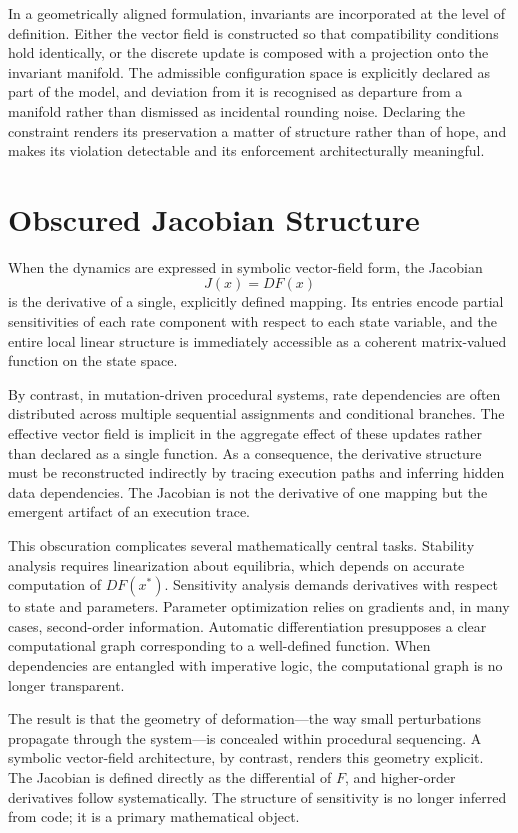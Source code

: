 \documentclass[12pt]{book}
\begin{document}
In a geometrically aligned formulation, invariants are incorporated at the
level of definition. Either the vector field is constructed so that
compatibility conditions hold identically, or the discrete update is composed
with a projection onto the invariant manifold. The admissible configuration
space is explicitly declared as part of the model, and deviation from it is
recognised as departure from a manifold rather than dismissed as incidental
rounding noise. Declaring the constraint renders its preservation a matter of
structure rather than of hope, and makes its violation detectable and its
enforcement architecturally meaningful.

\section{Obscured Jacobian Structure}

When the dynamics are expressed in symbolic vector-field form,
the Jacobian
\[
J(x) = DF(x)
\]
is the derivative of a single, explicitly defined mapping.
Its entries encode partial sensitivities of each rate component
with respect to each state variable, and the entire local linear
structure is immediately accessible as a coherent matrix-valued
function on the state space.

By contrast, in mutation-driven procedural systems, rate
dependencies are often distributed across multiple sequential
assignments and conditional branches. The effective vector field
is implicit in the aggregate effect of these updates rather than
declared as a single function. As a consequence, the derivative
structure must be reconstructed indirectly by tracing execution
paths and inferring hidden data dependencies. The Jacobian is not
the derivative of one mapping but the emergent artifact of an
execution trace.

This obscuration complicates several mathematically central tasks.
Stability analysis requires linearization about equilibria, which
depends on accurate computation of $DF(x^\ast)$. Sensitivity
analysis demands derivatives with respect to state and parameters.
Parameter optimization relies on gradients and, in many cases,
second-order information. Automatic differentiation presupposes
a clear computational graph corresponding to a well-defined
function. When dependencies are entangled with imperative logic,
the computational graph is no longer transparent.

The result is that the geometry of deformation---the way small
perturbations propagate through the system---is concealed within
procedural sequencing. A symbolic vector-field architecture, by
contrast, renders this geometry explicit. The Jacobian is defined
directly as the differential of $F$, and higher-order derivatives
follow systematically. The structure of sensitivity is no longer
inferred from code; it is a primary mathematical object.
\end{document}
